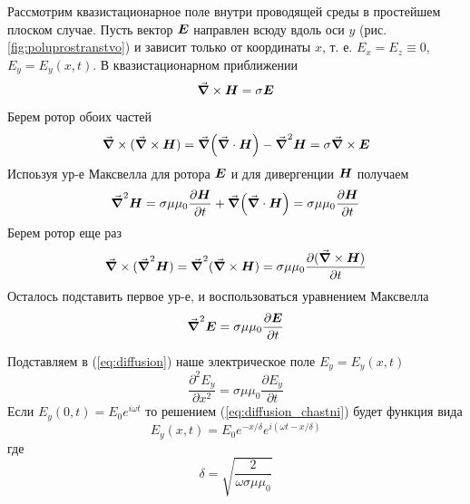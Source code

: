 \documentclass{article}
\begin{document}
 Рассмотрим квазистационарное поле внутри проводящей среды в простейшем плоском случае.
 Пусть вектор $\vb*{E}$ направлен всюду вдоль оси $y$ (рис.\ref{fig:poluprostranstvo}) 
 и зависит только от координаты $x$, т. е. ${E_x} = {E_z} \equiv 0$, $E_y=E_y(x,t)$.
 В квазистационарном приближении 
 \begin{equation*}
     \grad \times \vb*{H} = \sigma \vb*{E}
 \end{equation*}
 Берем ротор обоих частей
 \begin{equation*}
     \grad \times (\grad \times \vb*{H}) = \grad(\grad \cdot \vb*{H}) - \grad^2\vb*{H} = \sigma \grad \times \vb*{E}
 \end{equation*}
 Испоьзуя ур-е Максвелла для ротора $\vb*{E}$ и для дивергенции $\vb*{H}$ получаем
 \begin{equation}
     \grad^2 \vb*{H} = \sigma\mu\mu_0\frac{\partial\vb*{H}}{\partial t} 
                       + \grad(\grad \cdot \vb*{H}) = \sigma\mu\mu_0\frac{\partial\vb*{H}}{\partial t} 
     \label{eq:laplacian_H}
 \end{equation}
 Берем ротор еще раз
 \begin{equation*}
     \grad \times (\grad^2\vb*{H}) = \grad^2 (\grad \times \vb*{H}) =
     \sigma\mu\mu_0 \frac{\partial (\grad \times \vb*{H})}{\partial t}
 \end{equation*}
 Осталось подставить первое ур-е, и воспользоваться уравнением Максвелла
 \begin{equation}
     \grad^2\vb*{E}=\sigma\mu\mu_0 \frac{\partial \vb*{E}}{\partial t}\label{eq:diffusion}
 \end{equation}

 Подставляем в (\ref{eq:diffusion}) наше электрическое поле $E_y=E_y(x,t)$
 \begin{equation}
     \frac{\partial^2 E_y}{\partial x^2} = \sigma\mu\mu_0\frac{\partial E_y}{\partial t}
     \label{eq:diffusion_chastni}
 \end{equation}
 Если $E_y(0,t)=E_0 e^{i\omega t}$ то решением (\ref{eq:diffusion_chastni}) будет функция вида
 \begin{equation}
     E_y(x,t)=E_0 e^{-x/\delta} e^{i(\omega t - x/\delta)}
     \label{eq:skin_effect_poluprostranstvo}
 \end{equation}
 где
 \begin{equation}
     \delta = \sqrt{\frac{2}{\omega\sigma\mu\mu_0}}
     \label{eq:delta}
 \end{equation}

 \newpage
\end{document}
